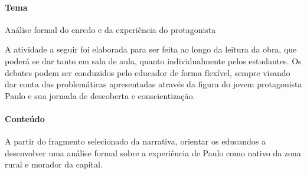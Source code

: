 \documentclass[12pt]{extarticle}
\begin{document}

\paragraph{Tema} Análise formal do enredo e da experiência do protagonista
  
A atividade a seguir foi elaborada para ser feita ao longo da leitura
da obra, que poderá se dar tanto em sala de aula, quanto
individualmente pelos estudantes. Os debates podem ser conduzidos pelo
educador de forma flexível, sempre visando dar conta das problemáticas
apresentadas através da figura do jovem protagonista Paulo e sua
jornada de descoberta e conscientização.

\paragraph{Conteúdo}
A partir do fragmento selecionado da narrativa, orientar os educandos
a desenvolver uma análise formal sobre a experiência de Paulo como
nativo da zona rural e morador da capital.
\end{document}
